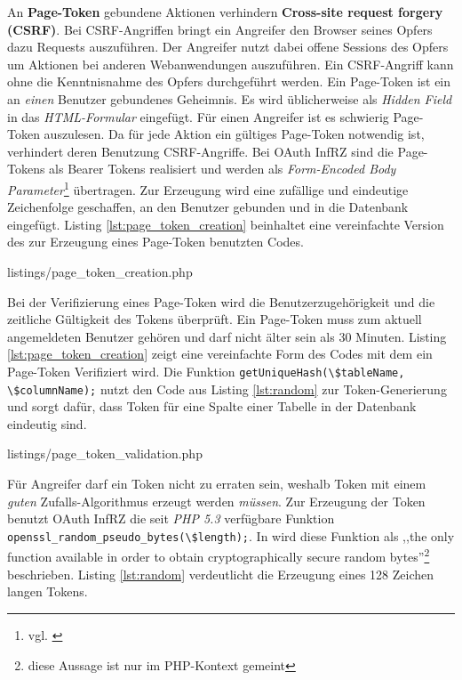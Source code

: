 \documentclass[12pt,a4paper,pointednumbers,abstracton]{scrartcl}
\newcommand{\code}[1]{\small\lstinline[style=InlinePHP]!#1!\normalsize}
\begin{document}
An \textbf{Page-Token} gebundene Aktionen verhindern \textbf{Cross-site request forgery (CSRF)}.
Bei CSRF-Angriffen bringt ein Angreifer den Browser seines Opfers dazu Requests auszuführen.
Der Angreifer nutzt dabei offene Sessions des Opfers um Aktionen bei anderen Webanwendungen auszuführen.
Ein CSRF-Angriff kann ohne die Kenntnisnahme des Opfers durchgeführt werden.
Ein Page-Token ist ein an \emph{einen} Benutzer gebundenes Geheimnis.
Es wird üblicherweise als \emph{Hidden Field} in das \emph{HTML-Formular} eingefügt.
Für einen Angreifer ist es schwierig Page-Token auszulesen.
Da für jede Aktion ein gültiges Page-Token notwendig ist, verhindert deren Benutzung CSRF-Angriffe.
Bei OAuth InfRZ sind die Page-Tokens als Bearer Tokens realisiert und werden als \emph{Form-Encoded Body Parameter}\footnote{vgl. \cite[Section 2.2]{RFC6750}} übertragen.
Zur Erzeugung wird eine zufällige und eindeutige Zeichenfolge geschaffen, an den Benutzer gebunden und in die Datenbank eingefügt.
Listing \ref{lst:page_token_creation} beinhaltet eine vereinfachte Version des zur Erzeugung eines Page-Token benutzten Codes.

\begin{minipage}{\textwidth}
	
	{listings/page_token_creation.php}
\end{minipage} 

Bei der Verifizierung eines Page-Token wird die Benutzerzugehörigkeit und die zeitliche Gültigkeit des Tokens überprüft.
Ein Page-Token muss zum aktuell angemeldeten Benutzer gehören und darf nicht älter sein als 30 Minuten.
Listing \ref{lst:page_token_creation} zeigt eine vereinfachte Form des Codes mit dem ein Page-Token Verifiziert wird.
Die Funktion \code{getUniqueHash(\$tableName, \$columnName);} nutzt den Code aus Listing \ref{lst:random} zur Token-Generierung und sorgt dafür, dass Token für eine Spalte einer Tabelle in der Datenbank eindeutig sind.

\begin{minipage}{\textwidth}
	
	{listings/page_token_validation.php}
\end{minipage}

Für Angreifer darf ein Token nicht zu erraten sein, weshalb Token mit einem \emph{guten} Zufalls-Algorithmus erzeugt werden \emph{müssen}.
Zur Erzeugung der Token benutzt OAuth InfRZ die seit \emph{PHP 5.3} verfügbare Funktion \code{openssl_random_pseudo_bytes(\$length);}.
In \cite[Section 2.2]{AK12} wird diese Funktion als ,,the only function available in order to obtain cryptographically secure random bytes''\footnote{diese Aussage ist nur im PHP-Kontext gemeint} beschrieben.
Listing \ref{lst:random} verdeutlicht die Erzeugung eines 128 Zeichen langen Tokens.
\end{document}
